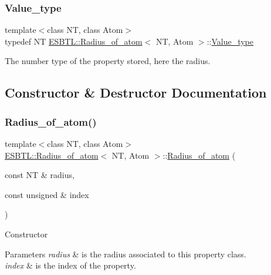 \subsubsection{\texorpdfstring{Value\+\_\+type}{Value\_type}}
{\footnotesize\ttfamily template$<$class NT, class Atom$>$ \\
typedef NT \hyperlink{classESBTL_1_1Radius__of__atom}{E\+S\+B\+T\+L\+::\+Radius\+\_\+of\+\_\+atom}$<$ NT, Atom $>$\+::\hyperlink{classESBTL_1_1Radius__of__atom_a8cb44bd5cb621ec4c5665650427ec84c}{Value\+\_\+type}}

The number type of the property stored, here the radius. 

\subsection{Constructor \& Destructor Documentation}
\mbox{\label{classESBTL_1_1Radius__of__atom_a1864548e1916887508cab51ad2cfe616}} 
\subsubsection{\texorpdfstring{Radius\+\_\+of\+\_\+atom()}{Radius\_of\_atom()}\hspace{0.1cm}{\footnotesize\ttfamily [1/2]}}
{\footnotesize\ttfamily template$<$class NT, class Atom$>$ \\
\hyperlink{classESBTL_1_1Radius__of__atom}{E\+S\+B\+T\+L\+::\+Radius\+\_\+of\+\_\+atom}$<$ NT, Atom $>$\+::\hyperlink{classESBTL_1_1Radius__of__atom}{Radius\+\_\+of\+\_\+atom} (\begin{DoxyParamCaption}\item[{const NT \&}]{radius,  }\item[{const unsigned \&}]{index }\end{DoxyParamCaption})\hspace{0.3cm}{\ttfamily [inline]}}

Constructor 
\begin{DoxyParams}{Parameters}
{\em radius} & is the radius associated to this property class. \\
\hline
{\em index} & is the index of the property. \\
\hline
\end{DoxyParams}
\mbox{\label{classESBTL_1_1Radius__of__atom_a71bf53c4053b1869d9b39216b5fc4602}} 
